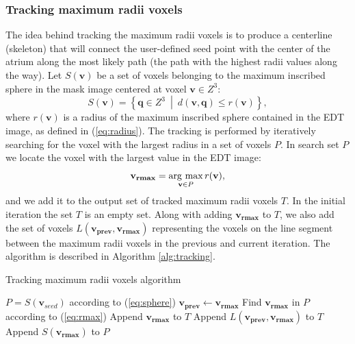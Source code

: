 \documentclass[review]{elsarticle}
\newcommand{\argmax}{\operatornamewithlimits{arg\ max}}
\begin{document}
\subsubsection{Tracking maximum radii voxels}
\label{sec:centerline_path}

The idea behind tracking the maximum radii voxels is to produce a centerline
(skeleton) that will connect the user-defined seed point with the center of the
atrium along the most likely path (the path with the highest radii values along
the way). 
Let $S(\mathbf{v})$ be a set of voxels belonging to the maximum inscribed sphere in the mask image centered at voxel $\mathbf{v} \in {Z}^3$:
\begin{equation}
  \label{eq:sphere}
  S(\mathbf{v}) = \left\{ \mathbf{q} \in {Z}^3 \ \middle| \ d(\mathbf{v}, \mathbf{q}) \leq r(\mathbf{v}) \right\},
\end{equation}
where $r(\mathbf{v})$ is a radius of the maximum inscribed sphere contained in the  EDT image, as defined in (\ref{eq:radius}). 
The tracking is performed by iteratively searching for the voxel with the largest radius
in a set of voxels $P$.
In search set $P$ we locate the voxel with the largest value in the  EDT image:
\begin{equation}
  \label{eq:rmax}
  \mathbf{v}_{\mathbf{rmax}} = \argmax_{\mathbf{v}\in P} r(\mathbf{v}),
\end{equation}
and we add it to the output set of tracked maximum radii voxels $T$.
In the initial iteration the set $T$ is an empty set. Along with adding
$\mathbf{v}_{\mathbf{rmax}}$ to $T$, we also add the set of voxels $L(\mathbf{v_{prev}}, \mathbf{v_{rmax}})$
representing the voxels on the line segment between the maximum radii voxels in
the previous and current iteration. The algorithm is described in 
Algorithm \ref{alg:tracking}.


\begin{algorithm}[tb]
  \caption{Tracking maximum radii voxels algorithm}
  \label{alg:tracking}
\begin{algorithmic}
  \State $P = S(\textbf{v}_{seed})$ according to (\ref{eq:sphere})
   \State $\mathbf{v_{prev}} \gets \mathbf{v_{rmax}}$
   \State Find $\mathbf{v}_{\mathbf{rmax}}$ in $P$ according to (\ref{eq:rmax})
   \State Append $\mathbf{v}_{\mathbf{rmax}}$ to $T$ 
   \State Append $L(\mathbf{v_{prev}}, \mathbf{v_{rmax}})$ to $T$
   \State Append $S(\mathbf{v}_{\mathbf{rmax}})$ to $P$ 
 \EndFor
\end{algorithmic}
\end{algorithm}
\end{document}
